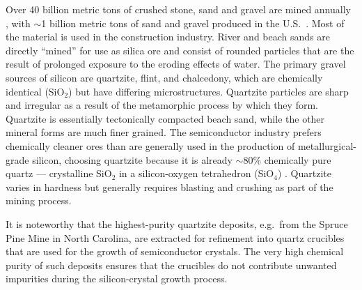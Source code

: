 \documentclass[final,5p]{elsarticle}
\begin{document}
Over 40 billion metric tons of crushed stone, sand and gravel are mined annually \cite{krausmann}, with $\sim$1 billion metric tons of sand and gravel produced in the U.S.\ \cite{usgs_minerals_2017}. Most of the material is used in the construction industry. River and beach sands are directly ``mined'' for use as silica ore and consist of rounded particles that are the result of prolonged exposure to the eroding effects of water. The primary gravel sources of silicon are quartzite, flint, and chalcedony, which are chemically identical (SiO$_2$) but have differing microstructures. Quartzite particles are sharp and irregular as a result of the metamorphic process by which they form. Quartzite is essentially tectonically compacted beach sand, while the other mineral forms are much finer grained. The semiconductor industry prefers chemically cleaner ores than are generally used in the production of metallurgical-grade silicon, choosing quartzite because it is already $\sim$80\% chemically pure quartz --- crystalline SiO$_2$ in a silicon-oxygen tetrahedron (SiO$_4$) \cite{quartzpage}. Quartzite varies in hardness but generally requires blasting and crushing as part of the mining process.

It is noteworthy that the highest-purity quartzite deposits, e.g.\ from the Spruce Pine Mine in North Carolina, are extracted for refinement into quartz crucibles that are used for the growth of semiconductor crystals. The very high chemical purity of such deposits ensures that the crucibles do not contribute unwanted impurities during the silicon-crystal growth process. %
\end{document}
